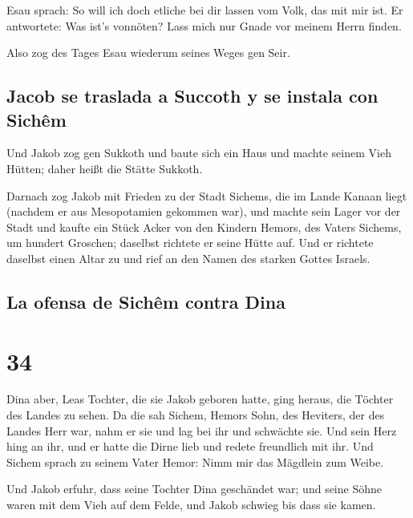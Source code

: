  Esau sprach: So will ich doch etliche bei dir lassen vom
Volk, das mit mir ist. Er antwortete: Was ist's vonnöten? Lass mich nur
Gnade vor meinem Herrn finden.

 Also zog des Tages Esau wiederum seines Weges gen Seir.

\hypertarget{jacob-se-traslada-a-succoth-y-se-instala-con-sichuxeam}{%
\subsection{Jacob se traslada a Succoth y se instala con
Sichêm}\label{jacob-se-traslada-a-succoth-y-se-instala-con-sichuxeam}}

 Und Jakob zog gen Sukkoth und baute sich ein Haus und
machte seinem Vieh Hütten; daher heißt die Stätte Sukkoth.

 Darnach zog Jakob mit Frieden zu der Stadt Sichems, die
im Lande Kanaan liegt (nachdem er aus Mesopotamien gekommen war), und
machte sein Lager vor der Stadt  und kaufte ein Stück
Acker von den Kindern Hemors, des Vaters Sichems, um hundert Groschen;
daselbst richtete er seine Hütte auf.  Und er richtete
daselbst einen Altar zu und rief an den Namen des starken Gottes
Israels.

\hypertarget{la-ofensa-de-sichuxeam-contra-dina}{%
\subsection{La ofensa de Sichêm contra
Dina}\label{la-ofensa-de-sichuxeam-contra-dina}}

\hypertarget{section-33}{%
\section{34}\label{section-33}}

 Dina aber, Leas Tochter, die sie Jakob geboren hatte,
ging heraus, die Töchter des Landes zu sehen.  Da die sah
Sichem, Hemors Sohn, des Heviters, der des Landes Herr war, nahm er sie
und lag bei ihr und schwächte sie.  Und sein Herz hing an
ihr, und er hatte die Dirne lieb und redete freundlich mit ihr.
 Und Sichem sprach zu seinem Vater Hemor: Nimm mir das
Mägdlein zum Weibe.

 Und Jakob erfuhr, dass seine Tochter Dina geschändet war;
und seine Söhne waren mit dem Vieh auf dem Felde, und Jakob schwieg bis
dass sie kamen.

